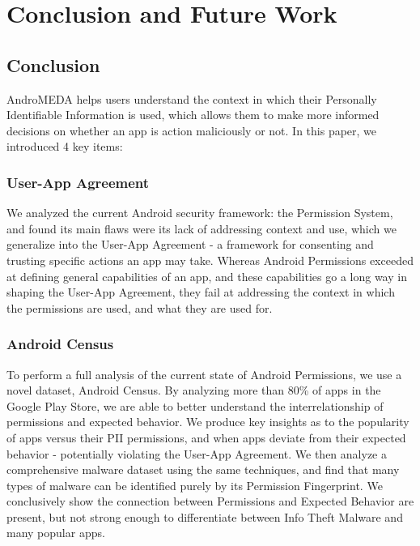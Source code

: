 \chapter{Conclusion and Future Work}
\label{sec:conclusion}
\section{Conclusion}
AndroMEDA helps users understand the context in which their Personally Identifiable Information is used, which allows them to make more informed decisions on whether an app is action maliciously or not. In this paper, we introduced 4 key items:

\subsection{User-App Agreement}

We analyzed the current Android security framework: the Permission System, and found its main flaws were its lack of addressing context and use, which we generalize into the User-App Agreement - a framework for consenting and trusting specific actions an app may take. Whereas Android Permissions exceeded at defining general capabilities of an app, and these capabilities go a long way in shaping the User-App Agreement, they fail at addressing the context in which the permissions are used, and what they are used for.

\subsection{Android Census}
To perform a full analysis of the current state of Android Permissions, we use a novel dataset, Android Census. By analyzing more than 80\% of apps in the Google Play Store, we are able to better understand the interrelationship of permissions and expected behavior. We produce key insights as to the popularity of apps versus their PII permissions, and when apps deviate from their expected behavior - potentially violating the User-App Agreement. We then analyze a comprehensive malware dataset using the same techniques, and find that many types of malware can be identified purely by its Permission Fingerprint. We conclusively show the connection between Permissions and Expected Behavior are present, but not strong enough to differentiate between Info Theft Malware and many popular apps.

